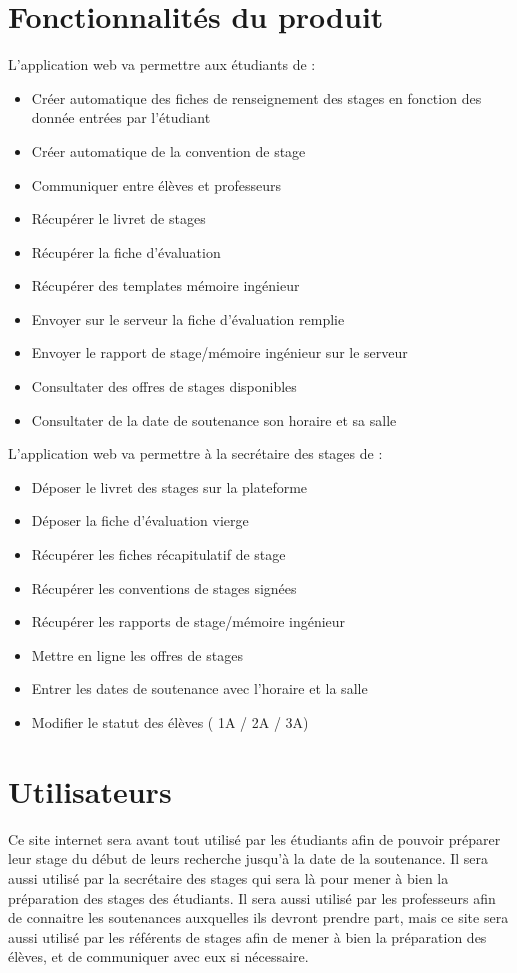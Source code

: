 \documentclass{scrreprt}
\begin{document}
\section{Fonctionnalités du produit}
L'application web va permettre aux étudiants de :
\begin{itemize}[label=\textbullet]
	\item Créer automatique des fiches de renseignement des stages en fonction des donnée entrées par l'étudiant
	\item Créer automatique de la convention de stage
	\item Communiquer entre élèves et professeurs
	\item Récupérer le livret de stages
	\item Récupérer la fiche d'évaluation
	\item Récupérer des templates mémoire ingénieur
	\item Envoyer sur le serveur la fiche d'évaluation remplie
	\item Envoyer le rapport de stage/mémoire ingénieur sur le serveur
	\item Consultater des offres de stages disponibles
	\item Consultater de la date de soutenance son horaire et sa salle
\end{itemize}

L'application web va permettre à la secrétaire des stages de :
\begin{itemize}[label=\textbullet]
	\item Déposer le livret des stages sur la plateforme
	\item Déposer la fiche d'évaluation vierge
	\item Récupérer les fiches récapitulatif de stage
	\item Récupérer les conventions de stages signées
	\item Récupérer les rapports de stage/mémoire ingénieur
	\item Mettre en ligne les offres de stages
	\item Entrer les dates de soutenance avec l'horaire et la salle
	\item Modifier le statut des élèves ( 1A / 2A / 3A)
	
\end{itemize}
	

\section{Utilisateurs}
\hspace{1cm}Ce site internet sera avant tout utilisé par les étudiants afin de pouvoir préparer leur stage du début de leurs recherche jusqu'à la date de la soutenance. Il sera aussi utilisé par la secrétaire des stages qui sera là pour mener à bien la préparation des stages des étudiants. Il sera aussi utilisé par les professeurs afin de connaitre les soutenances auxquelles ils devront prendre part, mais ce site sera aussi utilisé par les référents de stages afin de mener à bien la préparation des élèves, et de communiquer avec eux si nécessaire.\\
\end{document}
